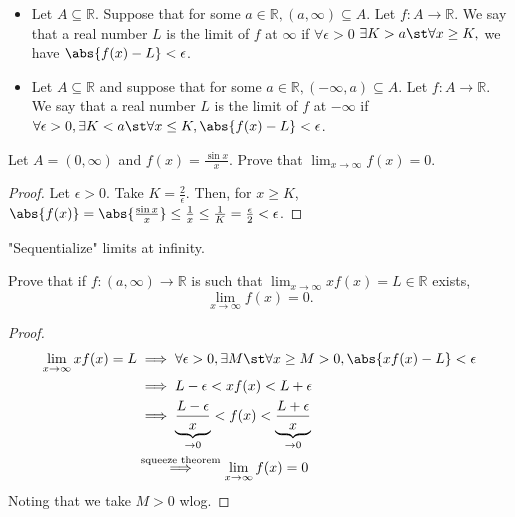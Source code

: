 \documentclass[12pt]{article}
\begin{document}
\begin{definition}
  \begin{itemize}
    \item Let $A \subseteq \mathbb{R}$. Suppose that for some $a \in \mathbb{R}, (a, \infty) \subseteq A$. Let $f: A \to \mathbb{R}$. We say that a real number $L$ is the limit of $f$ at $\infty$ if $\forall \epsilon > 0$ $\exists K > a \st \forall x \geq K, $ we have $\abs{f(x) - L} < \epsilon$.

    \item Let $A \subseteq \mathbb{R}$ and suppose that for some $a \in \mathbb{R}, (-\infty, a) \subseteq A$. Let $f: A \to \mathbb{R}$. We say that a real number $L$ is the limit of $f$ at $-\infty$ if $\forall \epsilon > 0, \exists K < a \st \forall x \leq K, \abs{f(x) - L} < \epsilon$.
  \end{itemize}
\end{definition}

\begin{example}
  Let $A = (0, \infty)$ and $f(x) = \frac{\sin x}{x}$. Prove that $\lim_{x\to\infty} f(x) = 0$.
  \begin{proof}
    Let $\epsilon >0$. Take $K = \frac{2}{\epsilon}$. Then, for $x \geq K$, $\abs{f(x)} = \abs{\frac{\sin x}{x}} \leq \frac{1}{x} \leq \frac{1}{K} = \frac{\epsilon}{2} < \epsilon$.
  \end{proof}
\end{example}

\begin{example}
  "Sequentialize" limits at infinity.
\end{example}

\begin{example}[Abbott, 4.4E9]
  Prove that if $f: (a, \infty) \to \mathbb{R}$ is such that $\lim_{x\to\infty} xf(x) = L\in\mathbb{R}$ exists, $$\lim_{x\to\infty} f(x) = 0.$$
  \begin{proof}
    \begin{align*}
      \lim_{x\to\infty} xf(x) = L&\implies \forall \epsilon > 0, \exists M \st \forall x \geq M > 0, \abs{x f(x) - L} < \epsilon\\
      &\implies L - \epsilon < x f(x) < L + \epsilon\\
      &\implies \underbrace{\frac{L-\epsilon}{x}}_{\to 0} < f(x) < \underbrace{\frac{L+\epsilon}{x}}_{\to 0}\\
      &\overset{\text{squeeze theorem}}{\implies} \lim_{x\to\infty} f(x) = 0
    \end{align*}
    Noting that we take $M > 0$ wlog.
  \end{proof}
\end{example}
\end{document}

